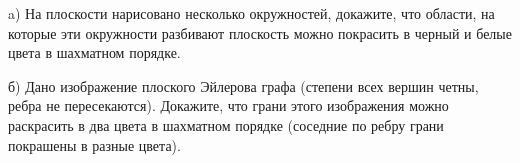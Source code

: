 \begin{itemtask}
   	\item [a)] На плоскости нарисовано несколько окружностей, докажите, что области, на которые эти окружности разбивают
    	плоскость можно покрасить в черный и белые цвета в шахматном порядке.
    \item [б)] Дано изображение плоского Эйлерова графа (степени всех вершин четны, ребра не пересекаются). Докажите, что
	    грани этого изображения можно раскрасить в два цвета в шахматном порядке (соседние по ребру грани покрашены в разные
        цвета).
\end{itemtask}